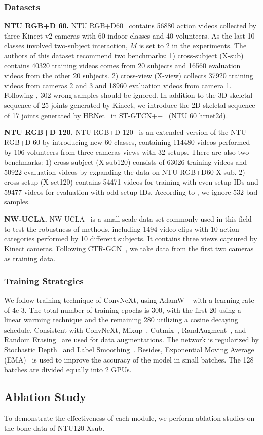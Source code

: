 \documentclass[10pt,twocolumn,letterpaper]{article}
\begin{document}
\subsubsection{Datasets}
\noindent\textbf{NTU RGB+D 60.} NTU RGB+D60~\cite{shahroudy2016ntu} contains 56880 action videos collected by three Kinect v2 cameras with 60 indoor classes and 40 volunteers. As the last 10 classes involved two-subject interaction, $M$ is set to 2 in the experiments. The authors of this dataset recommend two benchmarks: 1) cross-subject (X-sub) contains 40320 training videos comes from 20 subjects and 16560 evaluation videos from the other 20 subjects. 2) cross-view (X-view) collects 37920 training videos from cameras 2 and 3 and 18960 evaluation videos from camera 1. Following \cite{liu2019ntu}, 302 wrong samples should be ignored. In addition to the 3D skeletal sequence of 25 joints generated by Kinect, we introduce the 2D skeletal sequence of 17 joints generated by HRNet~\cite{wang2020deep} in ST-GTCN++~\cite{duan2021revisiting} (NTU 60 hrnet2d).

\noindent\textbf{NTU RGB+D 120.} NTU RGB+D 120~\cite{liu2019ntu} is an extended version of the NTU RGB+D 60 by introducing new 60 classes, containing 114480 videos performed by 106 volunteers from three cameras views with 32 setups. There are also two benchmarks: 1) cross-subject (X-sub120) consists of 63026 training videos and 50922 evaluation videos by expanding the data on NTU RGB+D60 X-sub. 2) cross-setup (X-set120) contains 54471 videos for training with even setup IDs and 59477 videos for evaluation with odd setup IDs. According to \cite{liu2019ntu}, we ignore 532 bad samples.

\noindent\textbf{NW-UCLA.} NW-UCLA~\cite{wang2014cross} is a small-scale data set commonly used in this field to test the robustness of methods, including 1494 video clips with 10 action categories performed by 10 different subjects. It contains three views captured by Kinect cameras. Following CTR-GCN~\cite{chen2021channel}, we take data from the first two cameras as training data.
\subsubsection{Training Strategies}
We follow training technique of ConvNeXt, using AdamW ~\cite{Loshchilov2019} with a learning rate of 4e-3. The total number of training epochs is 300, with the first 20 using a linear warming technique and the remaining 280 utilizing a cosine decaying schedule. Consistent with ConvNeXt, Mixup~\cite{Zhang2018a}, Cutmix~\cite{Yun2019}, RandAugment~\cite{Cubuk2020}, and Random Erasing~\cite{Zhong2020} are used for data augmentations. The network is regularized by Stochastic Depth~\cite{Huang2016deep} and Label Smoothing~\cite{Szegedy2016a}. Besides, Exponential Moving Average (EMA)~\cite{Polyak1992} is used to improve the accuracy of the model in small batches. The 128 batches are divided equally into 2 GPUs. \subsection{Ablation Study}
To demonstrate the effectiveness of each module, we perform ablation studies on the bone data of NTU120 Xsub.
\end{document}
